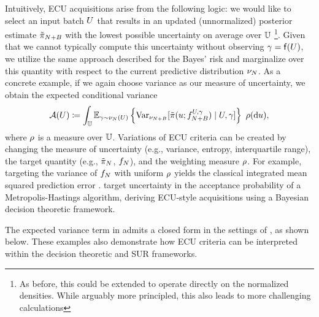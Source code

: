 \documentclass[12pt]{article}
\begin{document}
Intuitively, ECU acquisitions arise from the following logic: we would like to select an input batch 
$\ParBatch$ that results in an updated (unnormalized) posterior estimate $\postEm[\Naugment]$ with the lowest
possible uncertainty on average over $\parSpace$
\footnote{As before, this could be extended to operate directly on the normalized densities. While arguably more principled,
this also leads to more challenging calculations}. 
Given that we cannot typically compute this uncertainty without
observing $\batchResponse = \target(\ParBatch)$, we utilize the same approach described for the Bayes' risk 
and marginalize over this quantity with respect to the current predictive distribution $\emDist$. As a concrete example, 
if we again choose variance as our measure of uncertainty, we obtain the expected conditional variance
\begin{equation}
\acq(\ParBatch) \Def 
\int_{\parSpace} 
\E_{\gamma \sim \emDist(\ParBatch)} \left\{\Var_{\emDist[\Naugment]}[\postDens(\Par; \targetEm[\Naugment]^{\ParBatch,\gamma}) \given \ParBatch, \gamma]\right\} \ \weightdens(\d\Par),
 \label{eq:acq-intvar}
\end{equation}
where $\weightdens$ is a measure over $\parSpace$. Variations of ECU criteria can be created by changing the measure 
of uncertainty (e.g., variance, entropy, interquartile range), the target quantity (e.g., $\postEm$, $\targetEm$), and the 
weighting measure $\weightdens$. For example, targeting the variance of $\targetEm$ with uniform $\weightdens$ 
yields the classical integrated mean squared prediction error \citep{Mercer_kernels_IVAR}.
\citet{gpEmMCMC} target uncertainty in the acceptance probability of a Metropolis-Hastings
algorithm, deriving ECU-style acquisitions using a Bayesian decision theoretic framework.

The expected variance term in  admits a closed form in the settings of
, as shown below. These examples also demonstrate how ECU
criteria can be interpreted within the decision theoretic and SUR frameworks.
\end{document}
